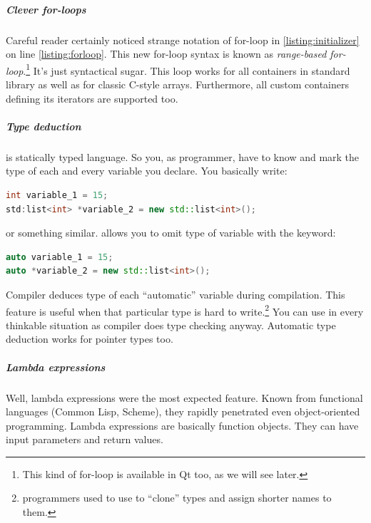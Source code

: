 \subparagraph*{Clever for-loops}
Careful reader certainly noticed strange notation of for-loop in \autoref{listing:initializer} on line \ref{listing:forloop}. This new for-loop syntax is known as \textit{range-based for-loop}.\footnote{This kind of for-loop is available in Qt too, as we will see later.} It's just syntactical sugar. This loop works for all containers in standard library as well as for classic C-style arrays. Furthermore, all custom containers defining its iterators are supported too.

\vfill

\subparagraph*{Type deduction}
\cpp is statically typed language. So you, as programmer, have to know and mark the type of each and every variable you declare. You basically write:
\begin{lstlisting}[firstnumber=1,language=cpp]
int variable_1 = 15;
std:list<int> *variable_2 = new std::list<int>();
\end{lstlisting}
or something similar.  allows you to omit type of variable with the keyword:
\begin{lstlisting}[firstnumber=1,language=cpp]
auto variable_1 = 15;
auto *variable_2 = new std::list<int>();
\end{lstlisting}
Compiler deduces type of each \enquote{automatic} variable during compilation. This feature is useful when that particular type is hard to write.\footnote{\cpp programmers used to use to \enquote{clone} types and assign shorter names to them.} You can use in every thinkable situation as compiler does type checking anyway. Automatic type deduction works for pointer types too.

\subparagraph*{Lambda expressions}
Well, lambda expressions were the most expected feature. Known from functional languages (\eg Common Lisp, Scheme), they rapidly penetrated even object-oriented programming. Lambda expressions are basically function objects. They can have input parameters and return values.

